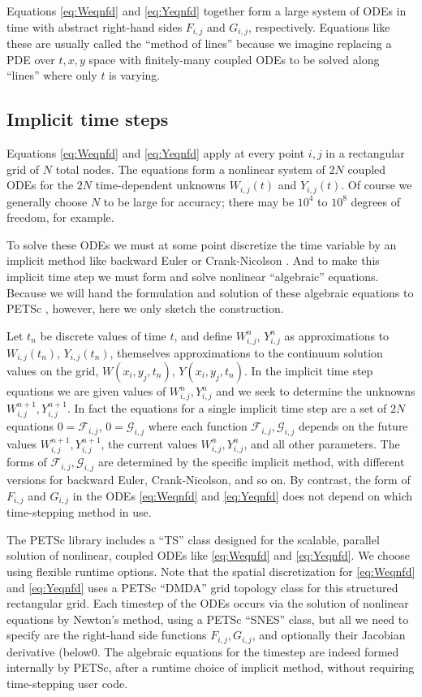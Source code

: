 \documentclass[11pt]{amsart}
\newcommand{\Wij}{W_{i,j}}
\newcommand{\Yij}{Y_{i,j}}
\begin{document}
Equations \eqref{eq:Weqnfd} and \eqref{eq:Yeqnfd} together form a large system of ODEs in time with abstract right-hand sides $F_{i,j}$ and $G_{i,j}$, respectively.  Equations like these are usually called the ``method of lines'' because we imagine replacing a PDE over $t,x,y$ space with finitely-many coupled ODEs to be solved along ``lines'' where only $t$ is varying.


\subsection*{Implicit time steps}   Equations \eqref{eq:Weqnfd} and \eqref{eq:Yeqnfd} apply at every point $i,j$ in a rectangular grid of $N$ total nodes.  The equations form a nonlinear system of $2N$ coupled ODEs for the $2N$ time-dependent unknowns $\Wij(t)$ and $\Yij(t)$.  Of course we generally choose $N$ to be large for accuracy; there may be $10^4$ to $10^8$ degrees of freedom, for example.

To solve these ODEs we must at some point discretize the time variable by an implicit method like backward Euler or Crank-Nicolson \citep{MortonMayers}.  And to make this implicit time step we must form and solve nonlinear ``algebraic'' equations.  Because we will hand the formulation and solution of these algebraic equations to PETSc  \citep{petsc-user-ref}, however, here we only sketch the construction.

Let $t_n$ be discrete values of time $t$, and define $\Wij^n$, $\Yij^n$ as approximations to $\Wij(t_n)$, $\Yij(t_n)$, themselves approximations to the continuum solution values on the grid, $W(x_i,y_j,t_n)$, $Y(x_i,y_j,t_n)$.  In the implicit time step equations we are given values of $\Wij^n,\Yij^n$ and we seek to determine the unknowns $\Wij^{n+1},\Yij^{n+1}$.  In fact the equations for a single implicit time step are a set of $2N$ equations $0 = \mathcal{F}_{i,j}$, $0=\mathcal{G}_{i,j}$ where each function $\mathcal{F}_{i,j},\mathcal{G}_{i,j}$ depends on the future values $\Wij^{n+1},\Yij^{n+1}$, the current values $\Wij^n,\Yij^n$, and all other parameters.  The forms of $\mathcal{F}_{i,j},\mathcal{G}_{i,j}$ are determined by the specific implicit method, with different versions for backward Euler, Crank-Nicolson, and so on.  By contrast, the form of $F_{i,j}$ and $G_{i,j}$ in the ODEs \eqref{eq:Weqnfd} and \eqref{eq:Yeqnfd} does not depend on which time-stepping method in use.

The PETSc \citep{petsc-user-ref} library includes a ``TS'' class designed for the scalable, parallel solution of nonlinear, coupled ODEs like \eqref{eq:Weqnfd} and \eqref{eq:Yeqnfd}.  We choose using flexible runtime options.  Note that the spatial discretization for \eqref{eq:Weqnfd} and \eqref{eq:Yeqnfd} uses a PETSc ``DMDA'' grid topology class for this structured rectangular grid.  Each timestep of the ODEs occurs via the solution of nonlinear equations by Newton's method, using a PETSc ``SNES'' class, but all we need to specify are the right-hand side functions $F_{i,j},G_{i,j}$, and optionally their Jacobian derivative (below0.  The algebraic equations for the timestep are indeed formed internally by PETSc, after a runtime choice of implicit method, without requiring time-stepping user code.
\end{document}
